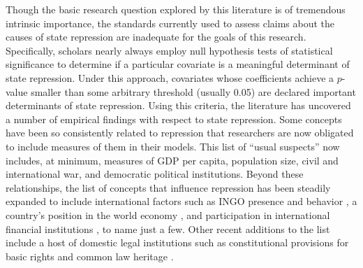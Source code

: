\documentclass[11pt]{article}
\begin{document}
Though the basic research question explored by this literature is of tremendous intrinsic importance, the standards currently used to assess claims about the causes of state repression are inadequate for the goals of this research. Specifically, scholars nearly always employ null hypothesis tests of statistical significance to determine if a particular covariate is a meaningful determinant of state repression. Under this approach, covariates whose coefficients achieve a $p$-value smaller than some arbitrary threshold (usually 0.05) are declared important determinants of state repression. Using this criteria, the literature has uncovered a number of empirical findings with respect to state repression. Some concepts have been so consistently related to repression that researchers are now obligated to include measures of them in their models. This list of ``usual suspects'' now includes, at minimum, measures of GDP per capita, population size, civil and international war, and democratic political institutions. Beyond these relationships, the list of concepts that influence repression has been steadily expanded to include international factors such as INGO presence and behavior \citep{HafnerBurtonTsutsui2005, Franklin2008, MurdieDavis2012}, a country's position in the world economy \citep{HafnerBurton2005jpr}, and participation in international financial institutions \citep{AbouharbCingranelli2006, AbouharbCingranelli2007}, to name just a few. Other recent additions to the list include a host of domestic legal institutions such as constitutional provisions for basic rights \citep{Cross1999, KeithTatePoe2009} and common law heritage \citep{Mitchell2013}. 
\end{document}

